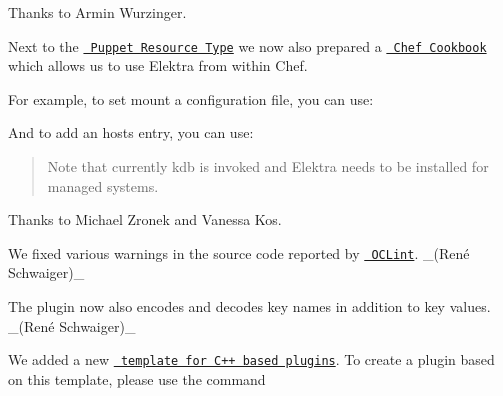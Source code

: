 Thanks to Armin Wurzinger.

Next to the \href{http://puppet.libelektra.org/}{\texttt{ Puppet Resource Type}} we now also prepared a \href{https://supermarket.chef.io/cookbooks/kdb}{\texttt{ Chef Cookbook}} which allows us to use Elektra from within Chef.

For example, to set mount a configuration file, you can use\+:


\begin{DoxyCode}{0}
\end{DoxyCode}


And to add an hosts entry, you can use\+:


\begin{DoxyCode}{0}
\end{DoxyCode}


\begin{quote}
Note that currently {\ttfamily kdb} is invoked and Elektra needs to be installed for managed systems. \end{quote}


Thanks to Michael Zronek and Vanessa Kos.


\begin{DoxyItemize}
\item We fixed various warnings in the source code reported by \href{http://oclint.org}{\texttt{ O\+C\+Lint}}. \+\_\+(René Schwaiger)\+\_\+
\item The plugin now also encodes and decodes key names in addition to key values. \+\_\+(René Schwaiger)\+\_\+
\end{DoxyItemize}


\begin{DoxyItemize}
\item We added a new \href{https://www.libelektra.org/plugins/cpptemplate}{\texttt{ template for C++ based plugins}}. To create a plugin based on this template, please use the command
\end{DoxyItemize}


\begin{DoxyCode}{0}
\end{DoxyCode}



